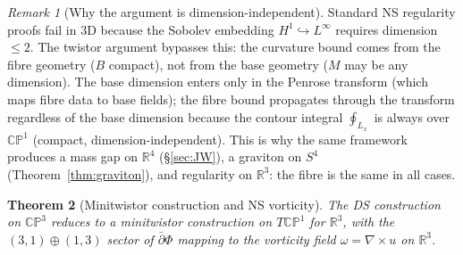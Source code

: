 \documentclass[11pt,a4paper]{article}
\newtheorem{theorem}{Theorem}[section]
\theoremstyle{definition}
\theoremstyle{remark}
\newtheorem{remark}[theorem]{Remark}
\newcommand{\CP}{\mathbb{CP}}
\newcommand{\R}{\mathbb{R}}
\newcommand{\dbar}{\bar{\partial}}
\begin{document}
\begin{remark}[Why the argument is dimension-independent]
Standard NS regularity proofs fail in $3$D because the Sobolev embedding $H^1\hookrightarrow L^\infty$ requires dimension $\leq 2$. The twistor argument bypasses this: the curvature bound comes from the fibre geometry ($B$ compact), not from the base geometry ($M$ may be any dimension). The base dimension enters only in the Penrose transform (which maps fibre data to base fields); the fibre bound propagates through the transform regardless of the base dimension because the contour integral $\oint_{L_x}$ is always over $\CP^1$ (compact, dimension-independent). This is why the same framework produces a mass gap on $\R^4$ (\S\ref{sec:JW}), a graviton on $S^4$ (Theorem~\ref{thm:graviton}), and regularity on $\R^3$: the fibre is the same in all cases.
\end{remark}

\begin{theorem}[Minitwistor construction and NS vorticity]\label{thm:minitwistor}
The DS construction on $\CP^3$ reduces to a minitwistor construction on $T\CP^1$ for $\R^3$, with the $(3,1)\oplus(1,3)$ sector of $\dbar\Phi$ mapping to the vorticity field $\omega=\nabla\times u$ on $\R^3$.
\end{theorem}
\end{document}
